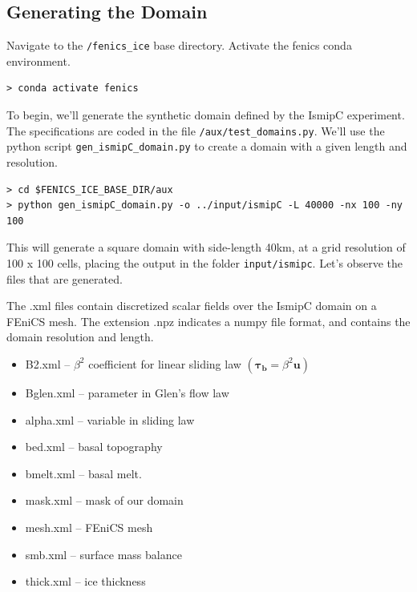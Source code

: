 \documentclass[11pt, reqno, nocenter]{article}
\begin{document}
\subsection{Generating the Domain}

Navigate to the {\tt /fenics\_ice} base directory. Activate the fenics conda environment.

\begin{verbatim}
> conda activate fenics 
\end{verbatim}

To begin, we'll generate the synthetic domain defined by the IsmipC experiment. The specifications are coded in the file {\tt /aux/test\_domains.py}. We'll use the python script {\tt gen\_ismipC\_domain.py} to create a domain with a given length and resolution.

\begin{verbatim}
> cd $FENICS_ICE_BASE_DIR/aux 
> python gen_ismipC_domain.py -o ../input/ismipC -L 40000 -nx 100 -ny 100 
\end{verbatim}

This will generate a square domain with side-length 40\si{\kilo\metre}, at a grid resolution of 100 x 100 cells, placing the output in the folder {\tt input/ismipc}.
Let's observe the files that are generated.


The .xml files contain discretized scalar fields over the IsmipC domain on a FEniCS mesh. The extension .npz indicates a numpy file format, and contains the domain resolution and length.

\begin{itemize}
\item B2.xml -- $\beta^2$ coefficient for linear sliding law $( = \beta^2 )$
\item  Bglen.xml -- parameter in Glen's flow law
\item alpha.xml -- variable in sliding law 
\item bed.xml -- basal topography
\item bmelt.xml -- basal melt. 
\item mask.xml -- mask of our domain
\item mesh.xml -- FEniCS mesh
\item smb.xml -- surface mass balance
\item thick.xml -- ice thickness

\end{itemize}
\end{document}
